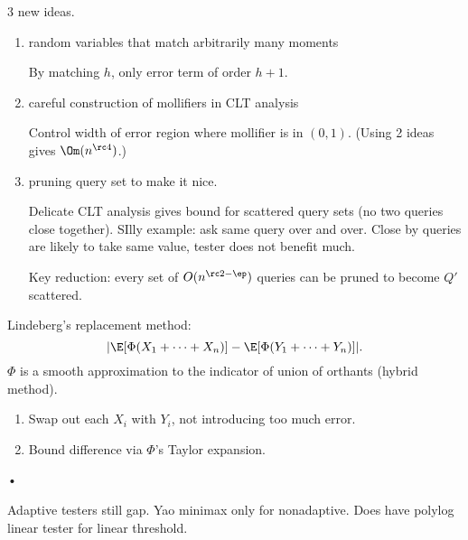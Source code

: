 3 new ideas.
\begin{enumerate}
\item
random variables that match arbitrarily many moments

By matching $h$, only error term of order $h+1$.
\item
careful construction of mollifiers in CLT analysis

Control width of error region where mollifier is in $(0,1)$.
(Using 2 ideas gives $\Om(n^{\rc 4})$.)
\item
pruning query set to make it nice.

Delicate CLT analysis gives bound for scattered query sets (no two queries close together). SIlly example: ask same query over and over. Close by queries are likely to take same value, tester does not benefit much. 

Key reduction: every set of $O(n^{\rc 2-\ep})$ queries can be pruned to become $Q'$ scattered.
\end{enumerate}


Lindeberg's replacement method: 
\[
|\E[\Phi(X_1+\cdots +X_n)]-\E[\Phi(Y_1+\cdots +Y_n)]|.
\]
$\Phi$ is a smooth approximation to the indicator of union of orthants (hybrid method). 
\begin{enumerate}
\item
Swap out each $X_i$ with $Y_i$, not introducing too much error.
\item
Bound difference via $\Phi$'s Taylor expansion.
\end{enumerate}•

Adaptive testers still gap. Yao minimax only for nonadaptive. Does have polylog linear tester for linear threshold.
